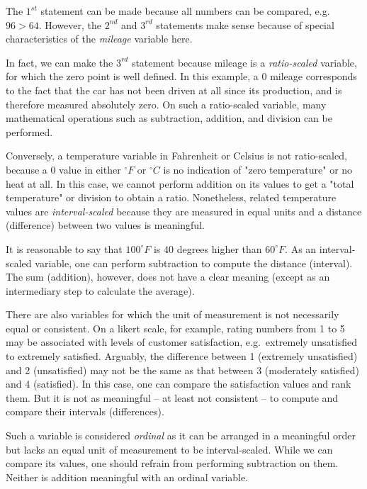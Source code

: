 \documentclass[
  letterpaper,
]{scrbook}
\begin{document}
The \(1^{st}\) statement can be made because all numbers can be
compared, e.g.~\(96>64\). However, the \(2^{nd}\) and \(3^{rd}\)
statements make sense because of special characteristics of the
\emph{mileage} variable here.

In fact, we can make the \(3^{rd}\) statement because mileage is a
\emph{ratio-scaled} variable, for which the zero point is well defined.
In this example, a \(0\) mileage corresponds to the fact that the car
has not been driven at all since its production, and is therefore
measured absolutely zero. On such a ratio-scaled variable, many
mathematical operations such as subtraction, addition, and division can
be performed.

Conversely, a temperature variable in Fahrenheit or Celsius is not
ratio-scaled, because a \(0\) value in either \(^{\circ}F\) or
\(^{\circ}C\) is no indication of "zero temperature" or no heat at all.
In this case, we cannot perform addition on its values to get a "total
temperature" or division to obtain a ratio. Nonetheless, related
temperature values are \emph{interval-scaled} because they are measured
in equal units and a distance (difference) between two values is
meaningful.

It is reasonable to say that \(100^{\circ}F\) is \(40\) degrees higher
than \(60^{\circ}F\). As an interval-scaled variable, one can perform
subtraction to compute the distance (interval). The sum (addition),
however, does not have a clear meaning (except as an intermediary step
to calculate the average).

There are also variables for which the unit of measurement is not
necessarily equal or consistent. On a likert scale, for example, rating
numbers from 1 to 5 may be associated with levels of customer
satisfaction, e.g.~extremely unsatisfied to extremely satisfied.
Arguably, the difference between 1 (extremely unsatisfied) and 2
(unsatisfied) may not be the same as that between 3 (moderately
satisfied) and 4 (satisfied). In this case, one can compare the
satisfaction values and rank them. But it is not as meaningful -- at
least not consistent -- to compute and compare their intervals
(differences).

Such a variable is considered \emph{ordinal} as it can be arranged in a
meaningful order but lacks an equal unit of measurement to be
interval-scaled. While we can compare its values, one should refrain
from performing subtraction on them. Neither is addition meaningful with
an ordinal variable.
\end{document}
